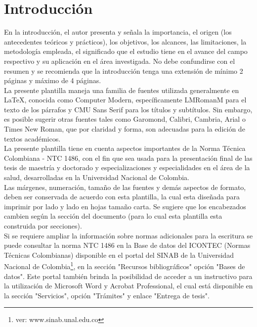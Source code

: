 \chapter{Introducción}
En la introducción, el autor presenta y señala la importancia, el origen (los antecedentes teóricos y prácticos), los objetivos, los alcances, las limitaciones, la metodología empleada, el significado que el estudio tiene en el avance del campo respectivo y su aplicación en el área investigada. No debe confundirse con el resumen y se recomienda que la introducción tenga una extensión de mínimo 2 páginas y máximo de 4 páginas.\\

La presente plantilla maneja una familia de fuentes utilizada generalmente en LaTeX, conocida como Computer Modern, específicamente LMRomanM para el texto de los párrafos y CMU Sans Serif para los títulos y subtítulos. Sin embargo, es posible sugerir otras fuentes tales como Garomond, Calibri, Cambria, Arial o Times New Roman, que por claridad y forma, son adecuadas para la edición de textos académicos.\\

La presente plantilla tiene en cuenta aspectos importantes de la Norma Técnica Colombiana - NTC 1486, con el fin que sea usada para la presentación final de las tesis de maestría y doctorado y especializaciones y especialidades en el área de la salud, desarrolladas en la Universidad Nacional de Colombia.\\

Las márgenes, numeración, tamaño de las fuentes y demás aspectos de formato, deben ser conservada de acuerdo con esta plantilla, la cual esta diseñada para imprimir por lado y lado en hojas tamaño carta. Se sugiere que los encabezados cambien según la sección del documento (para lo cual esta plantilla esta construida por secciones).\\

Si se requiere ampliar la información sobre normas adicionales para la escritura se puede consultar la norma NTC 1486 en la Base de datos del ICONTEC (Normas Técnicas Colombianas) disponible en el portal del SINAB de la Universidad Nacional de Colombia\footnote{ver: www.sinab.unal.edu.co}, en la sección "Recursos bibliográficos" opción "Bases de datos".  Este portal también brinda la posibilidad de acceder a un instructivo para la utilización de Microsoft Word y Acrobat Professional, el cual está disponible en la sección "Servicios", opción "Trámites" y enlace "Entrega de tesis".\\

